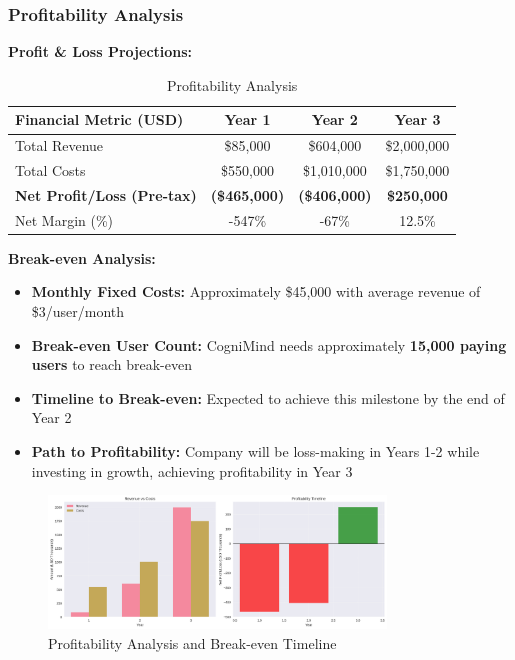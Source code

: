 \subsubsection{Profitability Analysis}
\textbf{Profit \& Loss Projections:}
\begin{table}[h]
\centering
\begin{tabular}{|l|c|c|c|}
\hline
\textbf{Financial Metric (USD)} & \textbf{Year 1} & \textbf{Year 2} & \textbf{Year 3} \\
\hline
Total Revenue & \$85,000 & \$604,000 & \$2,000,000 \\
Total Costs & \$550,000 & \$1,010,000 & \$1,750,000 \\
\hline
\textbf{Net Profit/Loss (Pre-tax)} & \textbf{(\$465,000)} & \textbf{(\$406,000)} & \textbf{\$250,000} \\
\hline
Net Margin (\%) & -547\% & -67\% & 12.5\% \\
\hline
\end{tabular}
\caption{Profitability Analysis}
\end{table}

\textbf{Break-even Analysis:}
\begin{itemize}
    \item \textbf{Monthly Fixed Costs:} Approximately \$45,000 with average revenue of \$3/user/month
    \item \textbf{Break-even User Count:} CogniMind needs approximately \textbf{15,000 paying users} to reach break-even
    \item \textbf{Timeline to Break-even:} Expected to achieve this milestone by the end of Year 2
    \item \textbf{Path to Profitability:} Company will be loss-making in Years 1-2 while investing in growth, achieving profitability in Year 3
\end{itemize}

\begin{figure}[h]
\centering
\includegraphics[width=0.8\textwidth]{graphics/profitability_analysis.png}
\caption{Profitability Analysis and Break-even Timeline}
\label{fig:profitability_analysis}
\end{figure}

